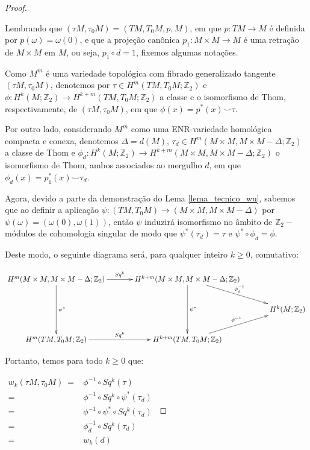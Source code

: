 \documentclass[12pt,oneside]{book} %
\newcommand{\Z}{\mathbb{Z}}
\newcommand{\ccup}{\smile}
\begin{document}
\begin{proof}
	
	\
	
	\par Lembrando que $(\tau M,\tau_{0}M)=(TM,T_{0}M,p,M)$, em que $p:TM\to M$ é definida por $p(\omega)=\omega(0)$, e que a projeção canônica $p_{1}:M\times M\to M$ é uma retração de $M\times M$ em $M$, ou seja, $p_{1}\circ d=1$, fixemos algumas notações.
	
	\par Como $M^{m}$ é uma variedade topológica com fibrado generalizado tangente $(\tau M,\tau_{0}M)$, denotemos por $\tau\in H^{m}(TM,T_{0}M;\Z_{2})$ e $\phi:H^{k}(M;\Z_{2})\to H^{k+m}(TM,T_{0}M;\Z_{2})$ a classe e o isomorfismo de Thom, respectivamente, de $(\tau M,\tau_{0}M)$, em que $\phi(x)=p^{*}(x)\ccup \tau$.
	
	\par Por outro lado, considerando $M^{m}$ como uma ENR-variedade homológica compacta e conexa, denotemos $\Delta=d(M)$, $\tau_{d}\in H^{m}(M\times M,M\times M-\Delta;\Z_{2})$ a classe de Thom e $\phi_{d}:H^{k}(M;\Z_{2})\to H^{k+m}(M\times M,M\times M-\Delta;\Z_{2})$ o isomorfismo de Thom, ambos associados ao mergulho $d$, em que $\phi_{d}(x)=p_{1}^{*}(x)\ccup\tau_{d}$.
	
	\par Agora, devido a parte da demonstração do Lema \ref{lema_tecnico_wu}, sabemos que ao definir a aplicação $\psi:(TM,T_{0}M)\to (M\times M,M\times M-\Delta)$ por $\psi(\omega)=(\omega(0),\omega(1))$, então $\psi$ induzirá isomorfismo no âmbito de $\Z_{2}-$módulos de cohomologia singular de modo que $\psi^{*}(\tau_{d})=\tau$ e $\psi^{*}\circ \phi_{d}=\phi$.
	
	\par Deste modo, o seguinte diagrama será, para qualquer inteiro $k\geq 0$, comutativo:
	
	$$ \xymatrix @C=0.5cm {
		H^{m}(M\times M,M\times M-\Delta;\Z_{2}) \ar[dd]^-{\psi^{*}} \ar[rr]^-{Sq^{k}} && H^{k+m}(M\times M,M\times M-\Delta;\Z_{2}) \ar[dd]^-{\psi^{*}} \ar[rrd]^-{\phi_{d}^{-1}} && \\
		&& && H^{k}(M;\Z_{2}) \\
		H^{m}(TM,T_{0}M;\Z_{2}) \ar[rr]^-{Sq^{k}} && H^{k+m}(TM,T_{0}M;\Z_{2}) \ar[rru]^-{\phi^{-1}} &&
	} $$
	
	\par Portanto, temos para todo $k\geq 0$ que: \newline
	
	$ \begin{array}{rl}
		w_{k}(\tau M,\tau_{0}M) \ = & \phi^{-1}\circ Sq^{k}(\tau) \\
		= & \phi^{-1}\circ Sq^{k}\circ \psi^{*}(\tau_{d}) \\
		= & \phi^{-1}\circ \psi^{*}\circ Sq^{k}(\tau_{d}) \\
		= & \phi_{d}^{-1}\circ Sq^{k}(\tau_{d}) \\
		= & w_{k}(d)
	\end{array} $
	
\end{proof}
\end{document}
